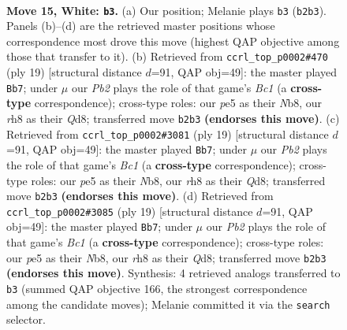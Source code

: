 \documentclass[11pt]{article}
\begin{document}
\clearpage

\begin{figure}[p]\centering
\begin{subfigure}{0.46\textwidth}\centering
\resizebox{\linewidth}{!}{%
\newchessgame
\chessboard[
  setfen={rn1qkb1r/5p2/3p1np1/2pPp3/4P3/2N1B2N/PP1K1P2/R4Q1R w q - 1 15},
  showmover=false,
  pgfstyle=straightmove, color=movearrow, markmove={b2-b3}
]}
\caption{}
\end{subfigure}\hfill
\begin{subfigure}{0.46\textwidth}\centering
\resizebox{\linewidth}{!}{%
\newchessgame
\chessboard[
  setfen={rnbqkb1r/5ppp/4pn2/p7/2BP4/4PN1P/5PP1/RNBQK2R b KQkq - 0 10},
  showmover=false,
  pgfstyle=straightmove, color=movearrow, markmove={c8-b7}
]}
\caption{}
\end{subfigure}
\\[4pt]
\begin{subfigure}{0.46\textwidth}\centering
\resizebox{\linewidth}{!}{%
\newchessgame
\chessboard[
  setfen={rnbqkb1r/5ppp/4pn2/p7/2BP4/4PN1P/5PP1/RNBQK2R b KQkq - 0 10},
  showmover=false,
  pgfstyle=straightmove, color=movearrow, markmove={c8-b7}
]}
\caption{}
\end{subfigure}\hfill
\begin{subfigure}{0.46\textwidth}\centering
\resizebox{\linewidth}{!}{%
\newchessgame
\chessboard[
  setfen={rnbqkb1r/5ppp/4pn2/p7/2BP4/4PN1P/5PP1/RNBQK2R b KQkq - 0 10},
  showmover=false,
  pgfstyle=straightmove, color=movearrow, markmove={c8-b7}
]}
\caption{}
\end{subfigure}
\caption{\textbf{Move 15, White: \texttt{b3}.} (a) Our position; Melanie plays \texttt{b3} (\texttt{b2b3}). Panels (b)--(d) are the retrieved master positions whose correspondence most drove this move (highest QAP objective among those that transfer to it). (b) Retrieved from \texttt{ccrl\_top\_p0002\#470} (ply 19) [structural distance $d$=91, QAP obj=49]: the master played \texttt{Bb7}; under $\mu$ our \emph{Pb2} plays the role of that game's \emph{Bc1} (a \textbf{cross-type} correspondence); cross-type roles: our \emph{p}e5 as their \emph{N}b8, our \emph{r}h8 as their \emph{Q}d8; transferred move \texttt{b2b3} \textbf{(endorses this move)}. (c) Retrieved from \texttt{ccrl\_top\_p0002\#3081} (ply 19) [structural distance $d$=91, QAP obj=49]: the master played \texttt{Bb7}; under $\mu$ our \emph{Pb2} plays the role of that game's \emph{Bc1} (a \textbf{cross-type} correspondence); cross-type roles: our \emph{p}e5 as their \emph{N}b8, our \emph{r}h8 as their \emph{Q}d8; transferred move \texttt{b2b3} \textbf{(endorses this move)}. (d) Retrieved from \texttt{ccrl\_top\_p0002\#3085} (ply 19) [structural distance $d$=91, QAP obj=49]: the master played \texttt{Bb7}; under $\mu$ our \emph{Pb2} plays the role of that game's \emph{Bc1} (a \textbf{cross-type} correspondence); cross-type roles: our \emph{p}e5 as their \emph{N}b8, our \emph{r}h8 as their \emph{Q}d8; transferred move \texttt{b2b3} \textbf{(endorses this move)}. Synthesis: 4 retrieved analogs transferred to \texttt{b3} (summed QAP objective 166, the strongest correspondence among the candidate moves); Melanie committed it via the \texttt{search} selector.}
\label{fig:thought-m28}
\end{figure}
\end{document}
